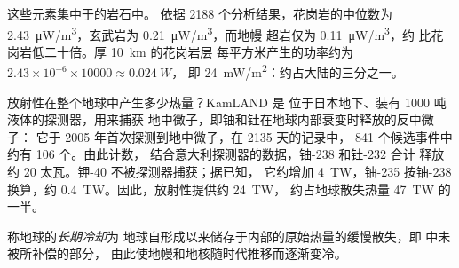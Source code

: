 这些元素集中于的岩石中。
依据 2188 个分析结果，花岗岩的中位数为
\qty{2.43}{\micro W/m^3}，玄武岩为 \qty{0.21}{\micro W/m^3}，而地幔
超岩仅为 \qty{0.11}{\micro W/m^3}，约
比花岗岩低二十倍。厚 \qty{10}{km} 的花岗岩层
每平方米产生的功率约为 $2.43 \times 10^{-6} \times \num{10000} \approx \qty{0.024}{W}$，
即 \qty{24}{mW/m^2}：约占大陆的三分之一。

放射性在整个地球中产生多少热量？KamLAND 是
位于日本地下、装有 1000 吨液体的探测器，用来捕获
地中微子，即铀和钍在地球内部衰变时释放的反中微子：
它于 2005 年首次探测到地中微子，在 2135 天的记录中，
841 个候选事件中约有 106 个。由此计数，
结合意大利探测器的数据，铀-238 和钍-232 合计
释放约 20 太瓦。钾-40 不被探测器捕获；据已知，
它约增加 \qty{4}{TW}，铀-235 按铀-238 换算，约
\qty{0.4}{TW}。因此，放射性提供约 \qty{24}{TW}，
约占地球散失热量 \qty{47}{TW} 的一半。

\begin{definition}[长期冷却]\label{def:g12:internal-heat:secular-cooling}
称地球的\emph{长期冷却}为
地球自形成以来储存于内部的原始热量的缓慢散失，即
中未被所补偿的部分，
由此使地幔和地核随时代推移而逐渐变冷。
\end{definition}

